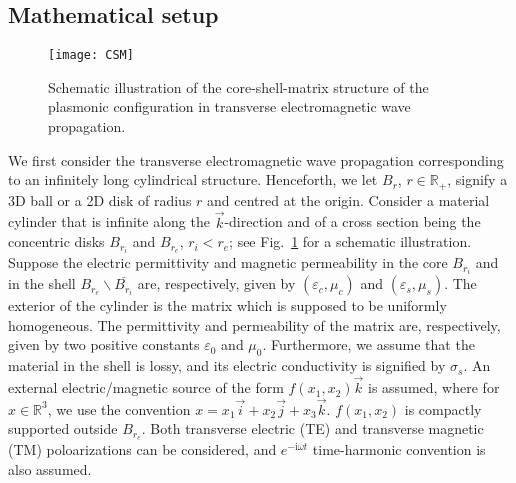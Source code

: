\documentclass[11pt,reqno,twoside]{amsart}
\theoremstyle{definition}
\theoremstyle{remark}
\numberwithin{equation}{section}
\begin{document}
\subsection{Mathematical setup}

\begin{figure}[t]
  \centering
 {\texttt{[image: CSM]}}
  \caption{Schematic illustration of the core-shell-matrix structure of the plasmonic configuration in transverse electromagnetic wave propagation. }
  \label{fig:1}
\end{figure}

We first consider the transverse electromagnetic wave propagation corresponding to an infinitely long cylindrical structure. Henceforth, we let $B_r$, $r\in\mathbb{R}_+$, signify a 3D ball or a 2D disk of radius $r$ and centred at the origin. Consider a material cylinder that is infinite along the $\vec{k}$-direction and of a cross section being the concentric disks $B_{r_i}$ and $B_{r_e}$, $r_i<r_e$; see Fig.~\ref{fig:1} for a schematic illustration. Suppose the electric permittivity and magnetic permeability in the core $B_{r_i}$ and in the shell $B_{r_e}\backslash\overline{B_{r_i}}$ are, respectively, given by $(\varepsilon_c, \mu_c)$ and $(\varepsilon_s,\mu_s)$. The exterior of the cylinder is the matrix which is supposed to be uniformly homogeneous. The permittivity and permeability of the matrix are, respectively, given by two positive constants $\varepsilon_0$ and $\mu_0$. Furthermore, we assume that the material in the shell is lossy, and its electric conductivity is signified by $\sigma_s$. An external electric/magnetic source of the form $f(x_1,x_2)\vec{k}$ is assumed, where for $x\in\mathbb{R}^3$, we use the convention $x=x_1\vec{i}+x_2\vec{j}+x_3\vec{k}$. $f(x_1,x_2)$ is compactly supported outside $B_{r_e}$. Both transverse electric (TE) and transverse magnetic (TM) poloarizations can be considered, and $e^{-\mathrm{i}\omega t}$ time-harmonic convention is also assumed.
\end{document}
